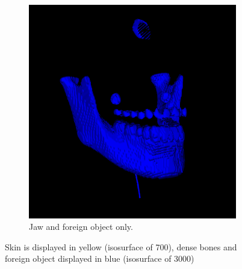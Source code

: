 \documentclass{article}
\begin{document}
\begin{figure}
\begin{subfigure}[b]{0.3\textwidth}
		\includegraphics[width=\textwidth]{jaw}
			\caption{Jaw and foreign object only.}
			\label{fig:jaw}
	\end{subfigure}
	\caption{Skin is displayed in yellow (isosurface of 700), dense bones and
	foreign object displayed in blue (isosurface of 3000)}\label{fig:skulls}
\end{figure}
\end{document}
